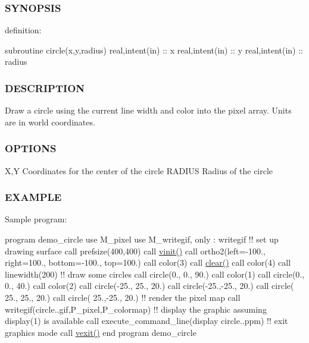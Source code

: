 \subsubsection*{S\+Y\+N\+O\+P\+S\+IS}

definition\+:

subroutine circle(x,y,radius) real,intent(in) \+:\+: x real,intent(in) \+:\+: y real,intent(in) \+:\+: radius

\subsubsection*{D\+E\+S\+C\+R\+I\+P\+T\+I\+ON}

Draw a circle using the current line width and color into the pixel array. Units are in world coordinates.

\subsubsection*{O\+P\+T\+I\+O\+NS}

X,Y Coordinates for the center of the circle R\+A\+D\+I\+US Radius of the circle

\subsubsection*{E\+X\+A\+M\+P\+LE}

Sample program\+:

program demo\+\_\+circle use M\+\_\+pixel use M\+\_\+writegif, only \+: writegif !! set up drawing surface call prefsize(400,400) call \hyperlink{namespacem__pixel_ac03ca8f23fdadb60599b6ea4dc87a6d9}{vinit()} call ortho2(left=-\/100., right=100., bottom=-\/100., top=100.) call color(3) call \hyperlink{namespacem__pixel_af3b81a21a0b2f6b5eddd09c031bd6173}{clear()} call color(4) call linewidth(200) !! draw some circles call circle(0., 0., 90.) call color(1) call circle(0., 0., 40.) call color(2) call circle(-\/25., 25., 20.) call circle(-\/25.,-\/25., 20.) call circle( 25., 25., 20.) call circle( 25.,-\/25., 20.) !! render the pixel map call writegif(\textquotesingle{}circle..\+gif\textquotesingle{},P\+\_\+pixel,P\+\_\+colormap) !! display the graphic assuming display(1) is available call execute\+\_\+command\+\_\+line(\textquotesingle{}display circle..\+ppm\textquotesingle{}) !! exit graphics mode call \hyperlink{namespacem__pixel_a19ad6b65752322b0029a62cc0ebec3e8}{vexit()} end program demo\+\_\+circle 

